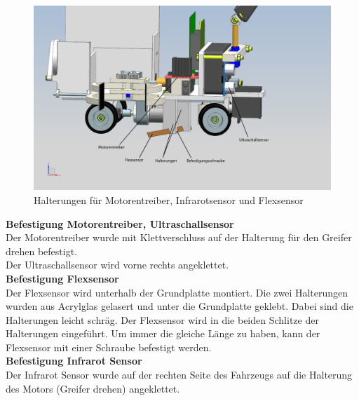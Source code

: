 \begin{figure}[H]
\centering
\includegraphics[width=1\textwidth]{03_Loesungskonzept/pictures/halterungen1.png}
\caption{Halterungen für Motorentreiber, Infrarotsensor und Flexsensor}
\end{figure}
\textbf{Befestigung Motorentreiber, Ultraschallsensor}\\[0.2cm]
Der Motorentreiber wurde mit Klettverschluss auf der Halterung für den Greifer drehen befestigt.\\[0.2cm]
Der Ultraschallsensor wird vorne rechts angeklettet.\\[0.2cm]
\textbf{Befestigung Flexsensor}\\[0.2cm]
Der Flexsensor wird unterhalb der Grundplatte montiert. Die zwei Halterungen wurden aus Acrylglas gelasert und unter die Grundplatte geklebt. Dabei sind die Halterungen leicht schräg. Der Flexsensor wird in die beiden Schlitze der Halterungen eingeführt. Um immer die gleiche Länge zu haben, kann der Flexsensor mit einer Schraube befestigt werden.\\[0.2cm]
\textbf{Befestigung Infrarot Sensor}\\[0.2cm]
Der Infrarot Sensor wurde auf der rechten Seite des Fahrzeugs auf die Halterung des Motors (Greifer drehen) angeklettet.